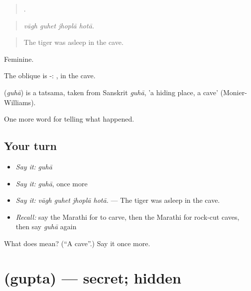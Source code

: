 \begin{quote}
   .
\end{quote}

\begin{quote}
\emph{vāgh guhet jhoplā hotā.}
\end{quote}

\begin{quote}
The tiger was asleep in the cave.
\end{quote}

Feminine.

The oblique is -: , in the cave.

\begin{cousinweb}
\textbf{} (\emph{guhā}) is a tatsama, taken from Sanskrit \emph{guhā}, 'a hiding place, a cave' (Monier-Williams).
\end{cousinweb}

\begin{grammarlens}[title={What you've built}]
One more word for telling what happened.
\end{grammarlens}

\subsection*{Your turn}
\begin{itemize}
\raggedright
  \item \emph{Say it:} \emph{guhā}
  \item \emph{Say it:} \emph{guhā}, once more
  \item \emph{Say it:} \emph{vāgh guhet jhoplā hotā.} — The tiger was asleep in the cave.
  \item \emph{Recall:} say the Marathi for to carve, then the Marathi for rock-cut caves, then say \emph{guhā} again
\end{itemize}

\begin{tcolorbox}[breakable,colback=teal!4,colframe=teal!35!black,title={Before you move on}]
What does  mean? (\textquotedblleft{}A cave\textquotedblright{}.) Say it once more.
\end{tcolorbox}
\section[\texorpdfstring{\mr{गुप्त} (gupta)}{गुप्त (gupta)}]{ (gupta) — secret; hidden}

\label{lesson:MR-C336-gupta}



